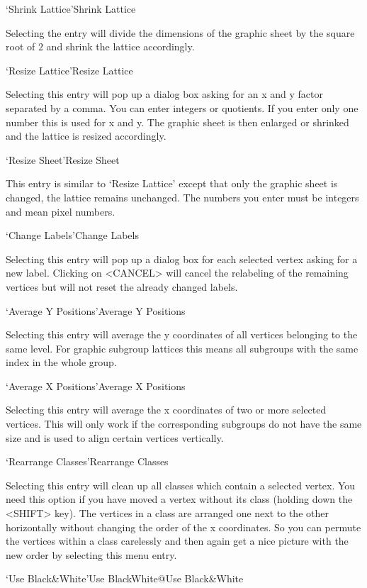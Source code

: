 \>`Shrink Lattice'{Shrink Lattice}

  Selecting  the entry will divide the  dimensions  of the graphic sheet by 
  the square root of $2$ and shrink the lattice accordingly.

\>`Resize Lattice'{Resize Lattice}

Selecting this entry will pop up a dialog box asking for an x and y factor
separated by a comma.  You can enter integers or quotients. If you enter
only one number this is used for x and y.  The graphic sheet is then
enlarged or shrinked and the lattice is resized accordingly.

\>`Resize Sheet'{Resize Sheet}

This  entry is similar to `Resize  Lattice' except that  only the graphic
sheet is changed, the lattice remains unchanged. The numbers you enter must 
be integers and mean pixel numbers.

\>`Change Labels'{Change Labels}

Selecting  this entry will pop  up a dialog  box for each selected vertex
asking for a new label.  Clicking on <CANCEL>  will cancel the relabeling
of the remaining vertices but will not reset the already changed labels.

\>`Average Y Positions'{Average Y Positions}

Selecting this entry will average the y coordinates of all vertices
belonging to the same level. For graphic subgroup lattices this means all
subgroups with the same index in the whole group.

\>`Average X Positions'{Average X Positions}

Selecting this entry  will  average the x   coordinates  of two or   more
selected vertices.  This will only work if the corresponding subgroups do
not have the same size and is used to align certain vertices
vertically.

\>`Rearrange Classes'{Rearrange Classes}

Selecting this entry will clean up all classes which contain a selected
vertex. You need this option if you have moved a vertex without its class
(holding down the <SHIFT> key). The vertices in a class are arranged one
next to the other horizontally without changing the order of the x
coordinates. So you can permute the vertices within a class carelessly and
then again get a nice picture with the new order by selecting this menu
entry.

\>`Use Black\&White'{Use BlackWhite}@{Use Black\&White}

